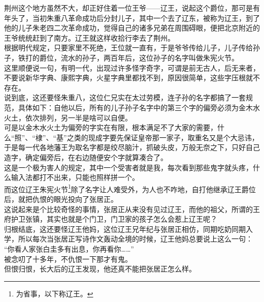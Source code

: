 \begin{multicols}{\theparacolNo}
荆州这个地方虽然不大，却正好住着一位王爷——辽王，说起这个爵位，那可是有年头了，当初朱重八革命成功后分封儿子，其中一个去了辽东，被称为辽王，到了他的儿子朱老四二次革命成功，觉得自己的诸多兄弟在周围碍眼，便把北京附近的王爷统统赶到了南方。辽王就这样收拾行李去了荆州。\\

根据明代规定，只要家里不死绝，王位就一直有，于是爷爷传给儿子，儿子传给孙子，铁打的爵位，流水的孙子，两百年后，这位孙子的名字叫做朱宪火节。\\

这里顺便说一句，有明一代，出现过许多怪字奇字，可谓是前无古人，后无来者，不要说新华字典、康熙字典，火星字典里都找不到，原因很简单，这些字压根就不存在。\\

说到底，这还要怪朱重八，这位仁兄实在太过劳模，连子孙的名字都搞了一套规范，具体如下：自他以后，所有的儿子孙子名字中的第三个字的偏旁必须为金木水火土，依次排列，另一半是啥可以自便。\\

可是以金木水火土为偏旁的字实在有限，根本满足不了大家的需要，什么“照”、“棣”、“基”之类的现成字要先保证皇帝那一家子，取重名又是个大忌讳，于是每一代各地藩王为取名字都是绞尽脑汁，抓破头皮，万般无奈之下，只好自己造字，确定偏旁后，在右边随便安个字就算凑合了。\\

这是一个极为害人的规定，其中一个受害者就是我，每次看到那些鬼字就头疼，什么输入法都打不出来，只能也照样拼一个。\\

而这位辽王朱宪火节\footnote{为省事，以下称辽王。}除了名字让人难受外，为人也不咋地，自打他继承辽王爵位后，就把仇恨的眼光投向了张居正。\\

这说起来是个比较奇怪的事情，张居正从来没有见过辽王，而他的祖父，所谓的王府护卫张镇，其实也就是个门卫，门卫家的孩子怎么会惹上辽王呢？\\

归根结底，这还要怪辽王他妈，这位辽王兄年纪与张居正相仿，同期吃奶同期入学，所以每次当张居正写诗作文轰动全境的时候，辽王他妈总要说上这么一句：\\

“你看人家张白圭多有出息，你再看你……”\\

被念叨了十多年，不仇恨一下那才有鬼。\\

但恨归恨，长大后的辽王发现，他还真不能把张居正怎么样。\\


\end{multicols}
